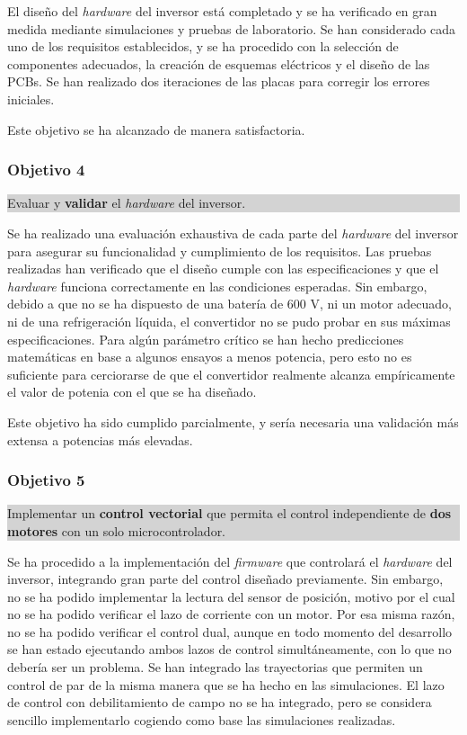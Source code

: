 El diseño del \textit{hardware} del inversor está completado y se ha verificado en gran medida mediante simulaciones y pruebas de laboratorio. Se han considerado cada uno de los requisitos establecidos, y se ha procedido con la selección de componentes adecuados, la creación de esquemas eléctricos y el diseño de las PCBs. Se han realizado dos iteraciones de las placas para corregir los errores iniciales. 

Este objetivo se ha alcanzado de manera satisfactoria.

\subsubsection*{Objetivo 4}
\colorbox{lightgray}{%
	\parbox{\dimexpr\linewidth-2\fboxsep-2\fboxrule}{%
		Evaluar y \textbf{validar} el \textit{hardware} del inversor.%
	}%
}

Se ha realizado una evaluación exhaustiva de cada parte del \textit{hardware} del inversor para asegurar su funcionalidad y cumplimiento de los requisitos. Las pruebas realizadas han verificado que el diseño cumple con las especificaciones y que el \textit{hardware} funciona correctamente en las condiciones esperadas. Sin embargo, debido a que no se ha dispuesto de una batería de 600 V, ni un motor adecuado, ni de una refrigeración líquida, el convertidor no se pudo probar en sus máximas especificaciones. Para algún parámetro crítico se han hecho predicciones matemáticas en base a algunos ensayos a menos potencia, pero esto no es suficiente para cerciorarse de que el convertidor realmente alcanza empíricamente el valor de potenia con el que se ha diseñado.

Este objetivo ha sido cumplido parcialmente, y sería necesaria una validación más extensa a potencias más elevadas.

\subsubsection*{Objetivo 5}
\colorbox{lightgray}{%
	\parbox{\dimexpr\linewidth-2\fboxsep-2\fboxrule}{%
		Implementar un \textbf{control vectorial} que permita el control independiente de \textbf{dos motores} con un solo microcontrolador.%
	}%
}

Se ha procedido a la implementación del \textit{firmware} que controlará el \textit{hardware} del inversor, integrando gran parte del control diseñado previamente. Sin embargo, no se ha podido implementar la lectura del sensor de posición, motivo por el cual no se ha podido verificar el lazo de corriente con un motor. Por esa misma razón, no se ha podido verificar el control dual, aunque en todo momento del desarrollo se han estado ejecutando ambos lazos de control simultáneamente, con lo que no debería ser un problema. Se han integrado las trayectorias que permiten un control de par de la misma manera que se ha hecho en las simulaciones. El lazo de control con debilitamiento de campo no se ha integrado, pero se considera sencillo implementarlo cogiendo como base las simulaciones realizadas. 

